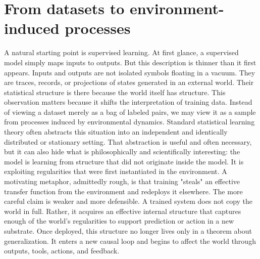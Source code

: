 \documentclass[11pt]{article}
\begin{document}
\section{From datasets to environment-induced processes}
A natural starting point is supervised learning. At first glance, a supervised model simply maps inputs to outputs. But this description is thinner than it first appears. Inputs and outputs are not isolated symbols floating in a vacuum. They are traces, records, or projections of states generated in an external world. Their statistical structure is there because the world itself has structure. This observation matters because it shifts the interpretation of training data. Instead of viewing a dataset merely as a bag of labeled pairs, we may view it as a sample from processes induced by environmental dynamics. Standard statistical learning theory often abstracts this situation into an independent and identically distributed or stationary setting. That abstraction is useful and often necessary, but it can also hide what is philosophically and scientifically interesting: the model is learning from structure that did not originate inside the model. It is exploiting regularities that were first instantiated in the environment. A motivating metaphor, admittedly rough, is that training "steals" an effective transfer function from the environment and redeploys it elsewhere. The more careful claim is weaker and more defensible. A trained system does not copy the world in full. Rather, it acquires an effective internal structure
that captures enough of the world's regularities to support prediction or action in a new substrate. Once deployed, this structure no longer lives only in a theorem about generalization. It enters a new causal loop and begins to affect the world through outputs, tools, actions, and feedback.
\end{document}
